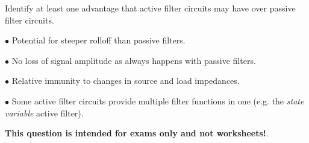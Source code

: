

Identify at least one advantage that active filter circuits may have over passive filter circuits.







\medskip
\item{$\bullet$} Potential for steeper rolloff than passive filters.
\item{$\bullet$} No loss of signal amplitude as always happens with passive filters.
\item{$\bullet$} Relative immunity to changes in source and load impedances.
\item{$\bullet$} Some active filter circuits provide multiple filter functions in one (e.g. the {\it state variable} active filter).
\medskip







{\bf This question is intended for exams only and not worksheets!}.



